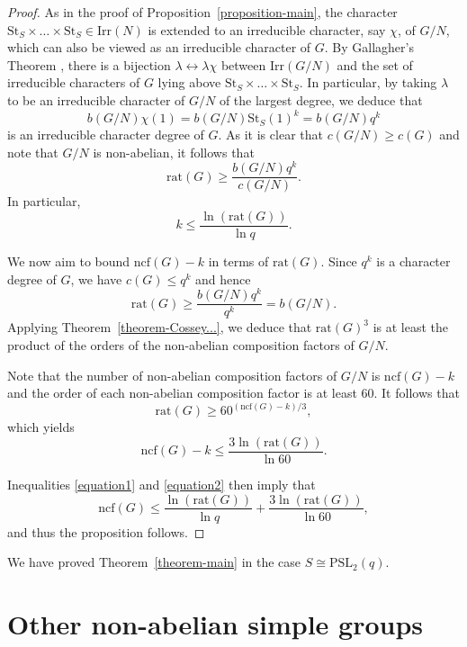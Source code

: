 \documentclass[12pt]{amsart}
\theoremstyle{definition}
\theoremstyle{remark}
\begin{document}
\begin{proof} As in the proof of Proposition~\ref{proposition-main}, the character
${{\mathrm {St}}}_S\times\dots\times {{\mathrm {St}}}_S\in{{\mathrm {Irr}}}(N)$ is extended to an
irreducible character, say $\chi$, of $G/N$, which can also be
viewed as an irreducible character of $G$. By Gallagher's Theorem
\cite[Corollary~6.17]{Isaacs1}, there is a bijection
$\lambda\leftrightarrow \lambda \chi$ between ${{\mathrm {Irr}}}(G/N)$ and the
set of irreducible characters of $G$ lying above
${{\mathrm {St}}}_S\times\dots\times {{\mathrm {St}}}_S$. In particular, by taking $\lambda$
to be an irreducible character of $G/N$ of the largest degree, we
deduce that
\[b(G/N)\chi(1)=b(G/N){{\mathrm {St}}}_S(1)^k=b(G/N)q^k\] is an irreducible character
degree of $G$. As it is clear that $c(G/N)\geq c(G)$ and note that
$G/N$ is non-abelian, it follows that
\[{{\mathrm {rat}}}(G)\geq \frac{b(G/N)q^k}{c(G/N)}.\] In particular,
\begin{equation}\label{equation1}k\leq \frac{\ln ({{\mathrm {rat}}}(G))}{\ln q}.\end{equation}

We now aim to bound ${{\mathrm {ncf}}}(G)-k$ in terms of ${{\mathrm {rat}}}(G)$. Since $q^k$
is a character degree of $G$, we have $c(G)\leq q^k$ and hence
\[{{\mathrm {rat}}}(G)\geq \frac{b(G/N)q^k}{q^k}=b(G/N).\]
Applying Theorem~\ref{theorem-Cossey...}, we deduce that ${{\mathrm {rat}}}(G)^3$
is at least the product of the orders of the non-abelian composition
factors of $G/N$.

Note that the number of non-abelian composition factors of $G/N$ is
${{\mathrm {ncf}}}(G)-k$ and the order of each non-abelian composition factor is
at least $60$. It follows that
\[{{\mathrm {rat}}}(G)\geq 60^{({{\mathrm {ncf}}}(G)-k)/3},\] which yields
\begin{equation}\label{equation2}{{\mathrm {ncf}}}(G)-k\leq \frac{3\ln({{\mathrm {rat}}}(G))}{\ln
60}.\end{equation}

Inequalities \ref{equation1} and \ref{equation2} then imply that
\[{{\mathrm {ncf}}}(G)\leq \frac{\ln ({{\mathrm {rat}}}(G))}{\ln q}+\frac{3\ln({{\mathrm {rat}}}(G))}{\ln
60},\] and thus the proposition follows.
\end{proof}

We have proved Theorem~\ref{theorem-main} in the case $S\cong
{{\mathrm {PSL}}}_2(q)$.

\section{Other non-abelian simple groups}
\end{document}
